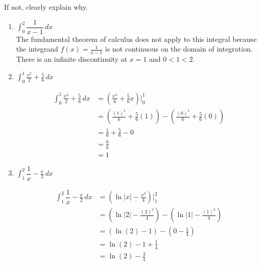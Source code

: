 \documentclass[11pt]{article}
\begin{document}
\begin{enumerate}
If not, clearly explain why.

\begin{enumerate}
    \item $\displaystyle\int_{0}^{2}\dfrac{1}{x-1}\, dx$\\

    {\color{blue} The fundamental theorem of calculus does not apply to this integral because the integrand $f(x) = \frac{1}{x - 1}$ is not continuous on the domain of integration. There is an infinite discontinuity at $x = 1$ and $0 < 1 < 2$.}
\vfill
    \item $\displaystyle\int_{0}^1  \frac{x^2}{2}+ \frac{5}{6}\, dx$
{\color{blue}
\begin{align*}
     \displaystyle\int_{0}^1  \frac{x^2}{2}+ \frac{5}{6}\, dx &= \left(\frac{x^3}{6} + \frac{5}{6}x \right)\bigg|_{0}^1\\
     &= \left(\frac{(1)^3}{6} + \frac{5}{6}(1)\right) - \left(\frac{(0)^3}{6} + \frac{5}{6}(0)\right)\\
     &= \frac{1}{6} + \frac{5}{6} - 0\\
     &= \frac{6}{6}\\
     &= 1
\end{align*}

}
    \vfill


   \item $\displaystyle\int_{1}^2\dfrac{1}{x}- \frac{x}{2}\, dx$
   {\color{blue}
   \begin{align*}
       \displaystyle\int_{1}^2\dfrac{1}{x}- \frac{x}{2}\, dx &= \left(\ln|x| - \frac{x^2}{4}\right)\bigg|_{1}^2\\
       &= \left(\ln|2| - \frac{(2)^2}{4}\right) - \left(\ln|1| - \frac{(1)^2}{4}\right)\\
       &= \left(\ln(2) - 1\right) - \left(0 - \frac{1}{4}\right)\\
       &= \ln(2) - 1 + \frac14\\
       &= \ln(2) - \frac{3}{4}
   \end{align*}
   
   }

    \vfill
\end{enumerate}



\end{enumerate}
\end{document}
